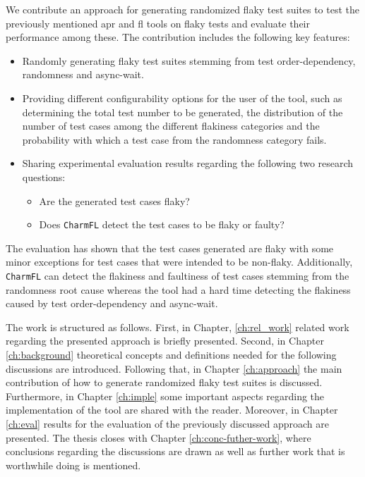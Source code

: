 \documentclass[
fancyheadings, %
%
%
]{stsreprt}
\begin{document}
We contribute an approach for generating randomized flaky test suites to test the previously mentioned \acrshort{apr} and \acrshort{fl} tools on flaky tests and evaluate their performance among these. 
The contribution includes the following key features:
\begin{itemize}
    \item Randomly generating flaky test suites stemming from test order-dependency, randomness and async-wait.
    \item Providing different configurability options for the user of the tool, such as determining the total test number to be generated, the distribution of the number of test cases among the different flakiness categories and the probability with which a test case from the randomness category fails. 
    \item Sharing experimental evaluation results regarding the following two research questions:
    \begin{itemize}
        \item Are the generated test cases flaky?
        \item Does \texttt{CharmFL} detect the test cases to be flaky or faulty?
    \end{itemize}
\end{itemize} \par
\newpage
The evaluation has shown that the test cases generated are flaky with some minor exceptions for test cases that were intended to be non-flaky. 
Additionally, \texttt{CharmFL} can detect the flakiness and faultiness of test cases stemming from the randomness root cause whereas the tool had a hard time detecting the flakiness caused by test order-dependency and async-wait. \par

The work is structured as follows. 
First, in Chapter, \ref{ch:rel_work} related work regarding the presented approach is briefly presented. 
Second, in Chapter \ref{ch:background} theoretical concepts and definitions needed for the following discussions are introduced. 
Following that, in Chapter \ref{ch:approach} the main contribution of how to generate randomized flaky test suites is discussed. 
Furthermore, in Chapter \ref{ch:imple} some important aspects regarding the implementation of the tool are shared with the reader. 
Moreover, in Chapter \ref{ch:eval} results for the evaluation of the previously discussed approach are presented.
The thesis closes with Chapter \ref{ch:conc-futher-work}, where conclusions regarding the discussions are drawn as well as further work that is worthwhile doing is mentioned. 
\end{document}

